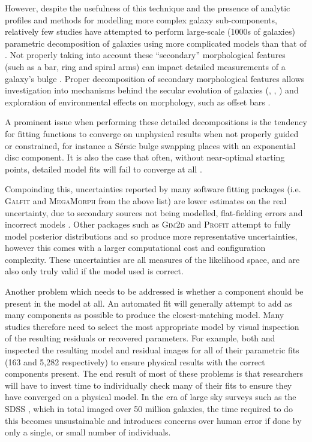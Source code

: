 \documentclass[../main.tex]{subfiles}
\begin{document}
However, despite the usefulness of this technique and the presence of analytic profiles and methods for modelling more complex galaxy sub-components, relatively few studies have attempted to perform large-scale (1000s of galaxies) parametric decomposition of galaxies using more complicated models than that of \citet{2011ApJS..196...11S}. Not properly taking into account these ``secondary'' morphological features (such as a bar, ring and spiral arms) can impact detailed measurements of a galaxy's bulge \citep{Gao2017:1709.00746v1}. Proper decomposition of secondary morphological features allows investigation into mechanisms behind the secular evolution of galaxies (\citealt{2018MNRAS.473.4731K}, \citealt{2018ApJ...862..100G}, \citealt{2015MNRAS.453.3729H}) and exploration of environmental effects on morphology, such as offset bars \citep{2017MNRAS.469.3363K}.

A prominent issue when performing these detailed decompositions is the tendency for fitting functions to converge on unphysical results when not properly guided or constrained, for instance a S\'ersic bulge swapping places with an exponential disc component. It is also the case that often, without near-optimal starting points, detailed model fits will fail to converge at all \citep{2016MNRAS.462.1470L}.

Compoinding this, uncertainties reported by many software fitting packages (i.e. \textsc{Galfit} and \textsc{MegaMorph} from the above list) are lower estimates on the real uncertainty, due to secondary sources not being modelled, flat-fielding errors and incorrect models \citep{2010AJ....139.2097P}. Other packages such as \textsc{Gim2d} and \textsc{Profit} attempt to fully model posterior distributions and so produce more representative uncertainties, however this comes with a larger computational cost and configuration complexity. These uncertainties are all measures of the likelihood space, and are also only truly valid if the model used is correct.

Another problem which needs to be addressed is whether a component should be present in the model at all. An automated fit will generally attempt to add as many components as possible to produce the closest-matching model. Many studies therefore need to select the most appropriate model by visual inspection of the resulting residuals or recovered parameters. For example, both \citet{Vika2014:1408.4070v1} and \citet{2018MNRAS.473.4731K} inspected the resulting model and residual images for all of their parametric fits (163 and 5,282 respectively) to ensure physical results with the correct components present. The end result of most of these problems is that researchers will have to invest time to individually check many of their fits to ensure they have converged on a physical model. In the era of large sky surveys such as the SDSS \citep{SDSSDR7}, which in total imaged over 50 million galaxies, the time required to do this becomes unsustainable and introduces concerns over human error if done by only a single, or small number of individuals.
\end{document}
